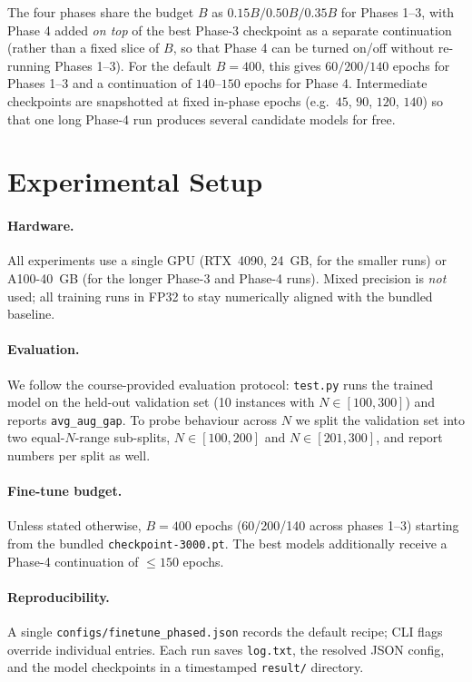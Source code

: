 \documentclass[11pt,a4paper]{article}
\begin{document}
The four phases share the budget $B$ as
$0.15B / 0.50B / 0.35B$ for Phases 1--3, with Phase 4 added \emph{on top}
of the best Phase-3 checkpoint as a separate continuation
(rather than a fixed slice of $B$, so that Phase 4 can be turned on/off
without re-running Phases 1--3). For the default $B=400$, this gives
$60 / 200 / 140$ epochs for Phases 1--3 and a continuation of
$140$--$150$ epochs for Phase 4. Intermediate checkpoints are snapshotted
at fixed in-phase epochs (e.g.\ $45$, $90$, $120$, $140$) so that one
long Phase-4 run produces several candidate models for free.

\section{Experimental Setup}
\label{sec:setup}

\paragraph{Hardware.} All experiments use a single GPU
(RTX~4090, 24~GB, for the smaller runs) or A100-40~GB (for the longer
Phase-3 and Phase-4 runs). Mixed precision is \emph{not} used; all training
runs in FP32 to stay numerically aligned with the bundled baseline.

\paragraph{Evaluation.} We follow the course-provided evaluation protocol:
\texttt{test.py} runs the trained model on the held-out validation set
(10 instances with $N\!\in\![100, 300]$) and reports
\texttt{avg\_aug\_gap}. To probe behaviour across $N$ we split the
validation set into two equal-$N$-range sub-splits, $N\!\in\![100,200]$
and $N\!\in\![201,300]$, and report numbers per split as well.

\paragraph{Fine-tune budget.} Unless stated otherwise, $B=400$ epochs
(60/200/140 across phases 1--3) starting from the bundled
\texttt{checkpoint-3000.pt}. The best models additionally receive a
Phase-4 continuation of $\le 150$ epochs.

\paragraph{Reproducibility.} A single \texttt{configs/finetune\_phased.json}
records the default recipe; CLI flags override individual entries. Each run
saves \texttt{log.txt}, the resolved JSON config, and the model checkpoints
in a timestamped \texttt{result/} directory.
\end{document}
